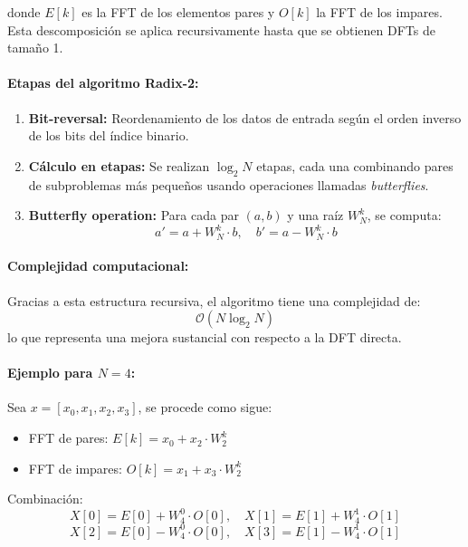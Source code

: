 donde $E[k]$ es la FFT de los elementos pares y $O[k]$ la FFT de los impares. Esta descomposición se aplica recursivamente hasta que se obtienen DFTs de tamaño 1.

\paragraph{Etapas del algoritmo Radix-2:}

\begin{enumerate}
    \item \textbf{Bit-reversal:} Reordenamiento de los datos de entrada según el orden inverso de los bits del índice binario.
    \item \textbf{Cálculo en etapas:} Se realizan $\log_2 N$ etapas, cada una combinando pares de subproblemas más pequeños usando operaciones llamadas \textit{butterflies}.
    \item \textbf{Butterfly operation:} Para cada par $(a, b)$ y una raíz $W_N^k$, se computa:
          \begin{equation}
              a' = a + W_N^k \cdot b, \quad b' = a - W_N^k \cdot b
          \end{equation}
\end{enumerate}

\paragraph{Complejidad computacional:}

Gracias a esta estructura recursiva, el algoritmo tiene una complejidad de:
\begin{equation}
    \mathcal{O}(N \log_2 N)
\end{equation}
lo que representa una mejora sustancial con respecto a la DFT directa.

\paragraph{Ejemplo para $N=4$:}

Sea $x = [x_0, x_1, x_2, x_3]$, se procede como sigue:

\begin{itemize}
    \item FFT de pares: $E[k] = x_0 + x_2 \cdot W_2^k$
    \item FFT de impares: $O[k] = x_1 + x_3 \cdot W_2^k$
\end{itemize}

\noindent Combinación:
\begin{equation}
    X[0] = E[0] + W_4^0 \cdot O[0], \quad X[1] = E[1] + W_4^1 \cdot O[1]
\end{equation}
\begin{equation}
    X[2] = E[0] - W_4^0 \cdot O[0], \quad X[3] = E[1] - W_4^1 \cdot O[1]
\end{equation}

